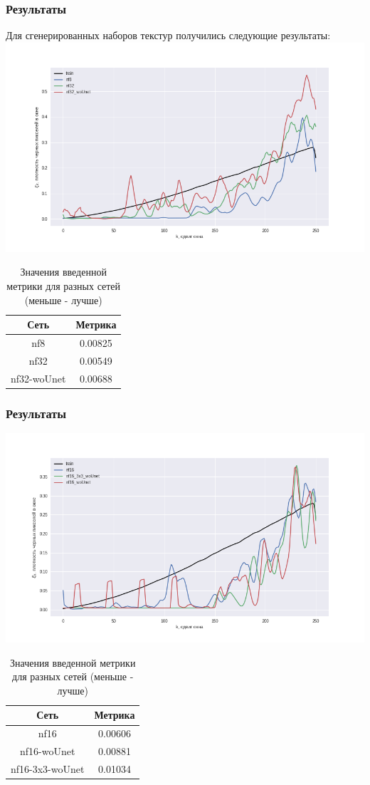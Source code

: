 \documentclass[9pt]{beamer}
\begin{document}
\begin{frame}\frametitle{Результаты}
	Для сгенерированных наборов текстур получились следующие результаты:
	\includegraphics[width=0.95\linewidth,height=0.4\textwidth]{tr_1}
	\begin{table}[h]
		\begin{tabular}{|c|c|}
			\hline
			Сеть & Метрика \\
			\hline
			nf8 & 0.00825\\
			\hline
			nf32 & 0.00549\\
			\hline
			nf32-woUnet & 0.00688\\
			\hline
		\end{tabular}
		\caption{Значения введенной метрики для разных сетей (меньше - лучше)}
	\end{table}
\end{frame}

\begin{frame}\frametitle{Результаты}
	\includegraphics[width=0.95\linewidth,height=0.4\textwidth]{tr_2}
	\begin{table}[h]
		\begin{tabular}{|c|c|}
			\hline
			Сеть & Метрика \\
			\hline
			nf16 & 0.00606\\
			\hline
			nf16-woUnet & 0.00881\\
			\hline
			nf16-3x3-woUnet & 0.01034\\
			\hline
		\end{tabular}
		\caption{Значения введенной метрики для разных сетей (меньше - лучше)}
	\end{table}
\end{frame}
\end{document}
